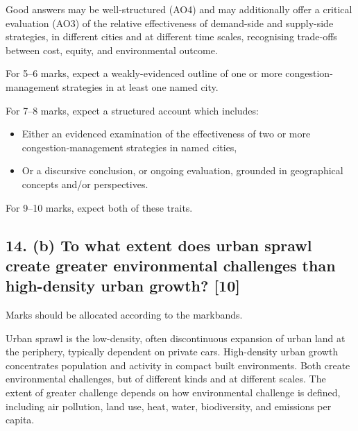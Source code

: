 \documentclass[11pt,a4paper]{article}
\begin{document}
Good answers may be well-structured (AO4) and may additionally offer a
critical evaluation (AO3) of the relative effectiveness of demand-side and
supply-side strategies, in different cities and at different time scales,
recognising trade-offs between cost, equity, and environmental outcome.

For 5--6 marks, expect a weakly-evidenced outline of one or more
congestion-management strategies in at least one named city.

For 7--8 marks, expect a structured account which includes:
\begin{itemize}
  \item Either an evidenced examination of the effectiveness of two or more
  congestion-management strategies in named cities,
  \item Or a discursive conclusion, or ongoing evaluation, grounded in
  geographical concepts and/or perspectives.
\end{itemize}

For 9--10 marks, expect both of these traits.

\subsection*{14. (b) To what extent does urban sprawl create greater environmental challenges than high-density urban growth? \hfill[10]}

Marks should be allocated according to the markbands.

Urban sprawl is the low-density, often discontinuous expansion of urban land at
the periphery, typically dependent on private cars. High-density urban growth
concentrates population and activity in compact built environments. Both create
environmental challenges, but of different kinds and at different scales. The
extent of greater challenge depends on how environmental challenge is defined,
including air pollution, land use, heat, water, biodiversity, and emissions per
capita.
\end{document}
